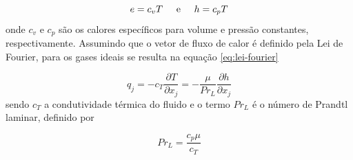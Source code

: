 \begin{equation}
	\label{eq:equacoes-entalpia-energiainterna-calores-especificos}
	e = c_{v}T \hspace{0.5cm} \text{e} \hspace{0.5cm} h = c_{p}T
\end{equation}
%
onde \(c_v\) e \(c_p\) são os calores específicos para volume e pressão constantes, respectivamente. Assumindo que o vetor de fluxo de calor é definido pela Lei de Fourier, para os gases ideais se resulta na equação \ref{eq:lei-fourier}

\begin{equation}
	\label{eq:lei-fourier}
	q_j = -c_T\frac{\partial T}{\partial x_j} = -\frac{\mu}{Pr_L}\frac{\partial h}{\partial x_j}
\end{equation}
%
sendo \(c_{T}\) a condutividade térmica do fluido e o termo \(Pr_L\) é o número de Prandtl laminar, definido por

\begin{equation}
	Pr_L = \frac{c_{p}\mu}{c_T}
\end{equation}